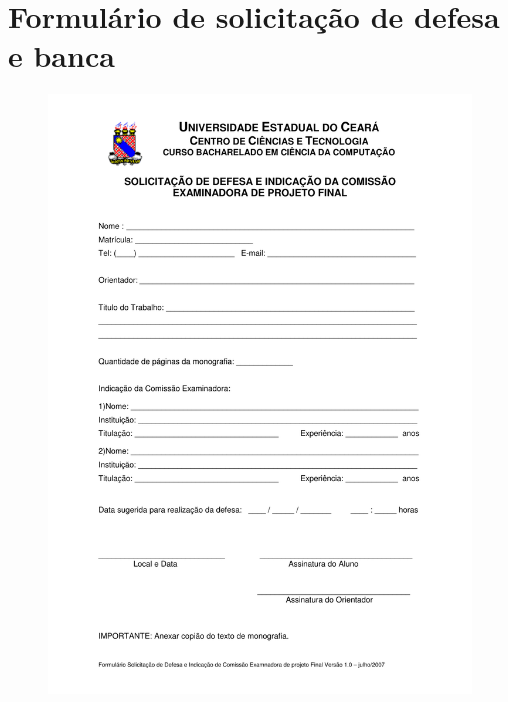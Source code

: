 \section{Formulário de solicitação de defesa e banca}
\label{anx:defesa}
\begin{figure}[htbp]
\centering
\includegraphics[scale=0.6]{requisitos/Formulario_Solicitacao_Defesa_e_Banca_v1.pdf}
\end{figure}

